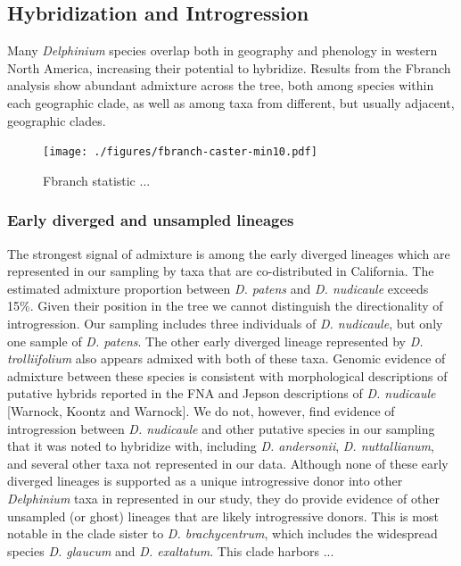 \documentclass[11pt]{article}
\begin{document}



\subsection{Hybridization and Introgression}
Many \emph{Delphinium} species overlap both in geography and phenology in western 
North America, increasing their potential to hybridize. Results from the Fbranch
analysis show abundant admixture across the tree, both among species within each 
geographic clade, as well as among taxa from different, but usually adjacent,
geographic clades.

\begin{figure}[t!]
	\centering
	\texttt{[image: ./figures/fbranch-caster-min10.pdf]}
	\caption{
        Fbranch statistic ...
	}
	\label{fig:fbranch}
\end{figure}

\subsubsection{Early diverged and unsampled lineages}
The strongest signal of admixture is among the early diverged lineages which are 
represented in our sampling by taxa that are co-distributed in California.
The estimated admixture proportion between \emph{D. patens} and \emph{D. nudicaule} 
exceeds 15\%. 
Given their position in the tree we cannot distinguish the directionality 
of introgression. Our sampling includes three individuals of \emph{D. nudicaule}, but
only one sample of \emph{D. patens}. 
% 
The other early diverged lineage represented by \emph{D. trolliifolium} also appears
admixed with both of these taxa.
Genomic evidence of admixture between these species is consistent with morphological
descriptions of putative hybrids reported in the FNA and Jepson descriptions 
of \emph{D. nudicaule} [Warnock, Koontz and Warnock]. We do not, however, find evidence
of introgression between \emph{D. nudicaule} and other putative species in our sampling 
that it was noted to hybridize with, including \emph{D. andersonii}, \emph{D. nuttallianum}, 
and several other taxa not represented in our data.
% 
Although none of these early diverged lineages is supported as a unique introgressive
donor into other \emph{Delphinium} taxa in represented in our study, they do provide
evidence of other unsampled (or ghost) lineages that are likely introgressive donors.
This is most notable in the clade sister to \emph{D. brachycentrum}, which includes 
the widespread species \emph{D. glaucum} and \emph{D. exaltatum}. 
This clade harbors ...
% 
\end{document}
